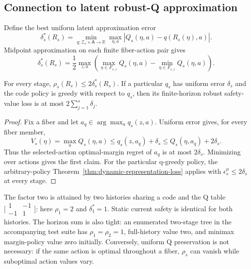 \subsection{Connection to latent robust-Q approximation}

Define the best uniform latent approximation error
\begin{equation}
 \delta_s^*(R_s)=\min_{q:\mathcal Z_s\times\mathsf A\to\mathbb R}
 \max_{\eta,a}|Q_s(\eta,a)-q(R_s(\eta),a)|.
 \label{eq:latent-q-error}
\end{equation}
Midpoint approximation on each finite fiber-action pair gives
\[
 \delta_s^*(R_s)=\frac12\max_{z,a}
 \left(\max_{\eta\in F_{s,z}}Q_s(\eta,a)
       -\min_{\eta\in F_{s,z}}Q_s(\eta,a)\right).
\]

\begin{theorem}\label{thm:uniform-q-sufficiency}
For every stage, $\rho_s(R_s)\leq2\delta_s^*(R_s)$.  If a particular $q_s$ has uniform error
$\delta_s$ and the code policy is greedy with respect to $q_s$, then its finite-horizon robust
safety-value loss is at most $2\sum_{j=1}^s\delta_j$.
\end{theorem}

\begin{proof}
Fix a fiber and let $a_q\in\arg\max_a q_s(z,a)$.  Uniform error gives, for every fiber member,
\[
 V_s(\eta)=\max_a Q_s(\eta,a)
 \leq q_s(z,a_q)+\delta_s
 \leq Q_s(\eta,a_q)+2\delta_s.
\]
Thus the selected-action optimal-margin regret of $a_q$ is at most $2\delta_s$.  Minimizing over
actions gives the first claim.  For the particular q-greedy policy, the arbitrary-policy
Theorem~\ref{thm:dynamic-representation-loss} applies with
$\epsilon_s^\mu\leq2\delta_s$ at every stage.
\end{proof}

The factor two is attained by two histories sharing a code and the Q table
$\bigl[\begin{smallmatrix}1&-1\\-1&1\end{smallmatrix}\bigr]$: here
$\rho_1=2$ and $\delta_1^*=1$.  Static current safety is identical for both histories.  The horizon
sum is also tight: an enumerated two-stage tree in the accompanying test suite has
$\rho_1=\rho_2=1$, full-history value two, and minimax margin-policy value zero initially.
Conversely, uniform Q preservation is not necessary: if the same action is optimal throughout a
fiber, $\rho_s$ can vanish while suboptimal action values vary.

